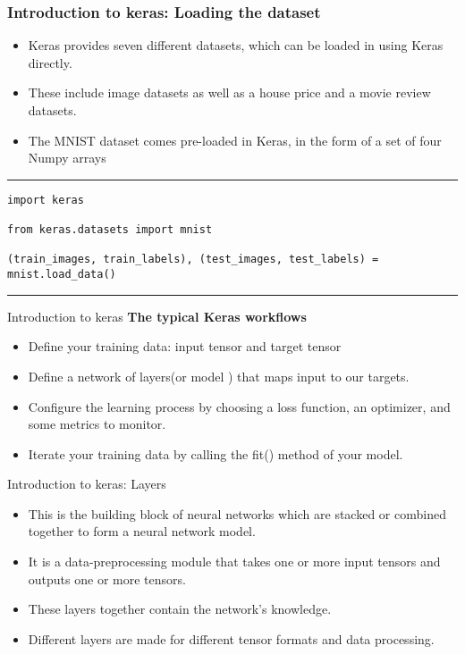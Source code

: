 \documentclass[11pt]{beamer}
\begin{document}
\begin{frame}[fragile]
\frametitle{Introduction to keras: Loading the dataset}
\begin{itemize}
\item Keras provides seven different datasets, which can be loaded in using Keras directly. 
\item These include image datasets as well as a house price and a movie review datasets.
\item The MNIST dataset comes pre-loaded in Keras, in the form of a set of four Numpy arrays
\end{itemize}
\rule{\textwidth}{1pt}
\scriptsize
\begin{verbatim}
import keras

from keras.datasets import mnist

(train_images, train_labels), (test_images, test_labels) = mnist.load_data()

\end{verbatim}
\rule{\textwidth}{1pt}
\end{frame}
\begin{frame}{Introduction to keras}
\textbf{The typical Keras workflows}
\vspace{0.5cm}
	\begin{itemize}
		\item Define your training data: input tensor and target tensor
		\item Define a network of layers(or model ) that maps input to our targets.
		\item Configure the learning process by choosing a loss function, an optimizer, and some metrics to monitor.
		\item Iterate your training data by calling the fit() method of your model.
	\end{itemize}
\end{frame}
\begin{frame}{Introduction to keras: Layers}
	\begin{itemize}
		\item This is the building block of neural networks which are stacked or combined together to form a neural network model.
		\item It is a data-preprocessing module that takes one or more input tensors and outputs one or more tensors. 
		\item These layers together contain the network's knowledge. 
		\item Different layers are made for different tensor formats and data processing.
	\end{itemize}
\end{frame}
\end{document}
